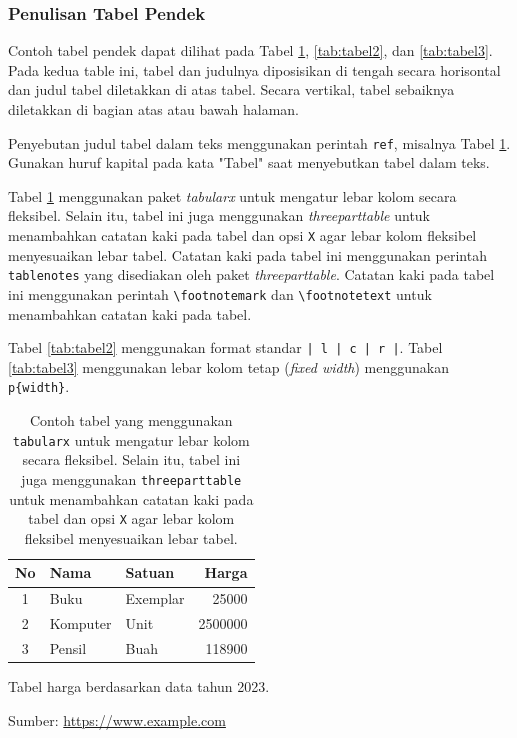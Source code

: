 \subsubsection{Penulisan Tabel Pendek}
Contoh tabel pendek dapat dilihat pada Tabel \ref{tab:tabel1}, \ref{tab:tabel2}, dan \ref{tab:tabel3}. 
Pada kedua table ini, tabel dan judulnya diposisikan di tengah secara horisontal dan 
judul tabel diletakkan di atas tabel. Secara vertikal, tabel sebaiknya diletakkan di bagian atas atau bawah halaman.

Penyebutan judul tabel dalam teks menggunakan perintah \texttt{ref}, misalnya Tabel \ref{tab:tabel1}.
Gunakan huruf kapital pada kata "Tabel" saat menyebutkan tabel dalam teks.

Tabel \ref{tab:tabel1} menggunakan paket \textit{tabularx} untuk mengatur lebar kolom secara fleksibel. 
Selain itu, tabel ini juga menggunakan \textit{threeparttable} untuk menambahkan catatan kaki pada tabel 
dan opsi \texttt{X} agar lebar kolom fleksibel menyesuaikan lebar tabel.
Catatan kaki pada tabel ini menggunakan perintah \texttt{tablenotes} yang disediakan oleh paket \textit{threeparttable}.
Catatan kaki pada tabel ini menggunakan perintah \texttt{\textbackslash footnotemark} dan \texttt{\textbackslash footnotetext} untuk menambahkan catatan kaki pada tabel.

Tabel \ref{tab:tabel2} menggunakan format standar \texttt{| l | c | r |}. 
Tabel \ref{tab:tabel3} menggunakan lebar kolom tetap (\textit{fixed width}) menggunakan \texttt{p\{width\}}.

\begin{table} 
  \centering
    \begin{threeparttable}[t] %
    \caption{Contoh tabel yang menggunakan \texttt{tabularx} untuk mengatur lebar kolom secara fleksibel. 
    Selain itu, tabel ini juga menggunakan \texttt{threeparttable} untuk menambahkan catatan kaki pada tabel 
    dan opsi \texttt{X} agar lebar kolom fleksibel menyesuaikan lebar tabel.}
    \label{tab:tabel1}
    \begin{tabularx}{0.6\textwidth}{| c | X| l | r @{}|} %
	    \hline
	    No & Nama 	& Satuan 		& Harga \\
	    \hline
	    1 & Buku 	& Exemplar	& 25000 \\
	    2 & Komputer	& Unit		& 2500000 \\
	    3 & Pensil	& Buah		& 118900 \\
	    \hline
	  \end{tabularx} 
    \begin{tablenotes}
      \footnotesize
      \item \footnotemark[1]Tabel harga berdasarkan data tahun 2023.
      \item \footnotemark[2]Sumber: \url{https://www.example.com}
    \end{tablenotes}
  \end{threeparttable}
\end{table}




